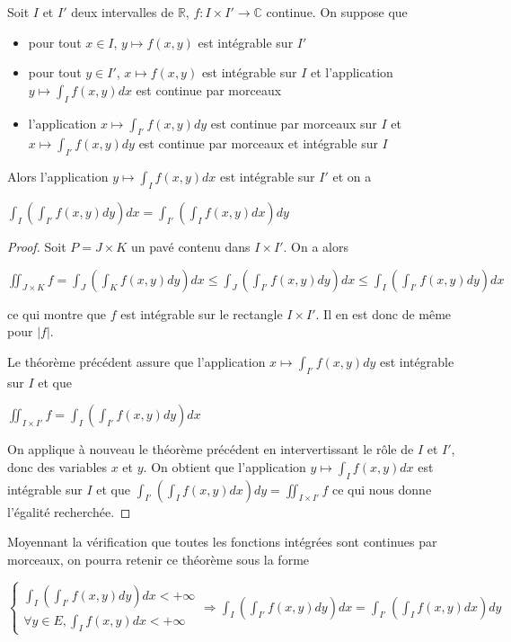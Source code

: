     \begin{thm}[Fubini]
    Soit $I$ et $I'$ deux intervalles de $\mathbb{R}$, $f : I \times I' \to \mathbb{C}$ continue. On suppose que
    \begin{itemize}
    \item pour tout $x \in I$, $y \mapsto f(x,y)$ est intégrable sur $I'$
    \item pour tout $y \in I'$, $x \mapsto f(x,y)$ est intégrable sur $I$ et l'application $y \mapsto \int_I f(x,y) dx$ est continue par morceaux
    \item l'application $x \mapsto \int_{I'} f(x,y) dy$ est continue par morceaux sur $I$ et $x \mapsto \int_{I'} f(x,y) dy$ est continue par morceaux et intégrable sur $I$
    \end{itemize}
    Alors l'application $y \mapsto \int_I f(x,y) dx$ est intégrable sur $I'$ et on a
    
    $\int_I \left(\int_{I'} f(x,y) dy\right) dx = \int_{I'} \left(\int_I f(x,y) dx\right) dy$
    \end{thm}
    
    \begin{proof}
    Soit $P = J \times K$ un pavé contenu dans $I \times I'$. On a alors
    
    $\iint_{J \times K} f = \int_J \left(\int_K f(x,y) dy\right) dx \leq \int_J \left(\int_{I'} f(x,y) dy\right) dx \leq \int_I \left(\int_{I'} f(x,y) dy\right) dx$
    
    ce qui montre que $f$ est intégrable sur le rectangle $I \times I'$. Il en est donc de même pour $|f|$.
    
    Le théorème précédent assure que l'application $x \mapsto \int_{I'} f(x,y) dy$ est intégrable sur $I$ et que
    
    $\iint_{I \times I'} f = \int_I \left(\int_{I'} f(x,y) dy\right) dx$
    
    On applique à nouveau le théorème précédent en intervertissant le rôle de $I$ et $I'$, donc des variables $x$ et $y$. On obtient que l'application $y \mapsto \int_I f(x,y) dx$ est intégrable sur $I$ et que $\int_{I'} \left(\int_I f(x,y) dx\right) dy = \iint_{I \times I'} f$ ce qui nous donne l'égalité recherchée.
    \end{proof}
    
    \begin{rem}
    Moyennant la vérification que toutes les fonctions intégrées sont continues par morceaux, on pourra retenir ce théorème sous la forme
    
    $\left\{\begin{array}{l}
    \int_I \left(\int_{I'} f(x,y) dy\right) dx < +\infty \\
    \forall y \in E, \int_I f(x,y) dx < +\infty 
    \end{array}\right. \Rightarrow \int_I \left(\int_{I'} f(x,y) dy\right) dx = \int_{I'} \left(\int_I f(x,y) dx\right) dy$
    \end{rem}
    
